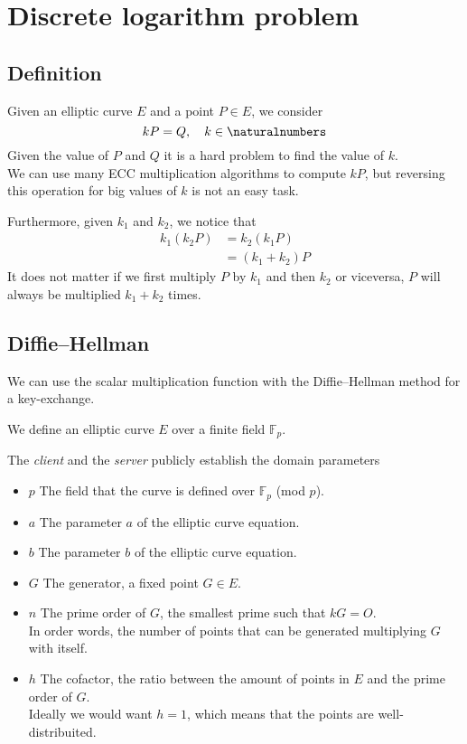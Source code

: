 \documentclass[a4paper]{article}
\begin{document}
\pagebreak

\section{Discrete logarithm problem}

\subsection{Definition}

Given an elliptic curve \(E\) and a point \(P\in E\), we consider
\[
    kP=Q,\quad
    k\in\naturalnumbers
\]
Given the value of \(P\) and \(Q\) it is a hard problem to find the value of \(k\).\\
We can use many ECC multiplication algorithms to compute \(kP\), but reversing this operation for big values of \(k\) is not an easy task.

Furthermore, given \(k_1\) and \(k_2\), we notice that
\begin{align*}
    k_1(k_2P)&=k_2(k_1P)\\
    &=(k_1+k_2)P
\end{align*}
It does not matter if we first multiply \(P\) by \(k_1\) and then \(k_2\) or viceversa, \(P\) will always be multiplied \(k_1+k_2\) times.

\subsection{Diffie–Hellman}

We can use the scalar multiplication function with the Diffie–Hellman method for a key-exchange.

We define an elliptic curve \(E\) over a finite field \(\mathbb{F}_p\).

The \textit{client} and the \textit{server} publicly establish the domain parameters
\begin{itemize}
    \item \(p\) The field that the curve is defined over \(\mathbb{F}_p\) (mod \(p\)).
    \item \(a\) The parameter \(a\) of the elliptic curve equation.
    \item \(b\) The parameter \(b\) of the elliptic curve equation.
    \item \(G\) The generator, a fixed point \(G\in E\).
    \item \(n\) The prime order of \(G\), the smallest prime such that \(kG=O\).\\In order words, the number of points that can be generated multiplying \(G\) with itself.
    \item \(h\) The cofactor, the ratio between the amount of points in \(E\) and the prime order of \(G\).\\Ideally we would want \(h=1\), which means that the points are well-distribuited.
\end{itemize}
\end{document}
